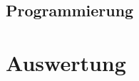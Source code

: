\documentclass[a4paper, 12pt]{article}
\begin{document}
\subsection{Programmierung}

\section{Auswertung}
\end{document}
